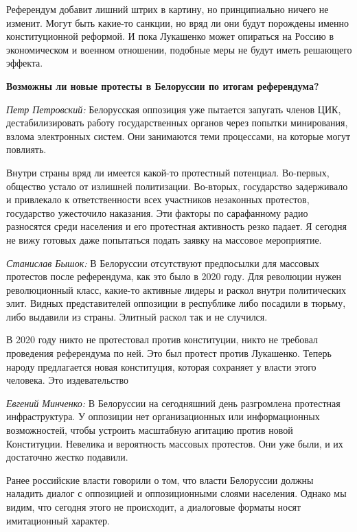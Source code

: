 Референдум добавит лишний штрих в картину, но принципиально ничего не изменит. Могут быть какие-то санкции, но вряд ли они будут порождены именно конституционной реформой. И пока Лукашенко может опираться на Россию в экономическом и военном отношении, подобные меры не будут иметь решающего эффекта.

\textbf{Возможны ли новые протесты в Белоруссии по итогам референдума?}

\textit{Петр Петровский:} Белорусская оппозиция уже пытается запугать членов ЦИК, дестабилизировать работу государственных органов через попытки минирования, взлома электронных систем. Они занимаются теми процессами, на которые могут повлиять.

Внутри страны вряд ли имеется какой-то протестный потенциал. Во-первых, общество устало от излишней политизации. Во-вторых, государство задерживало и привлекало к ответственности всех участников незаконных протестов, государство ужесточило наказания. Эти факторы по сарафанному радио разносятся среди населения и его протестная активность резко падает. Я сегодня не вижу готовых даже попытаться подать заявку на массовое мероприятие.

\textit{Станислав Бышок:} В Белоруссии отсутствуют предпосылки для массовых протестов после референдума, как это было в 2020 году. Для революции нужен революционный класс, какие-то активные лидеры и раскол внутри политических элит. Видных представителей оппозиции в республике либо посадили в тюрьму, либо выдавили из страны. Элитный раскол так и не случился.

\begin{fancyquotes}
    В 2020 году никто не протестовал против конституции, никто не требовал проведения референдума по ней. Это был протест против Лукашенко. Теперь народу предлагается новая конституция, которая сохраняет у власти этого человека. Это издевательство
\end{fancyquotes}

\textit{Евгений Минченко:} В Белоруссии на сегодняшний день разгромлена протестная инфраструктура. У оппозиции нет организационных или информационных возможностей, чтобы устроить масштабную агитацию против новой Конституции. Невелика и вероятность массовых протестов. Они уже были, и их достаточно жестко подавили.

Ранее российские власти говорили о том, что власти Белоруссии должны наладить диалог с оппозицией и оппозиционными слоями населения. Однако мы видим, что сегодня этого не происходит, а диалоговые форматы носят имитационный характер.

